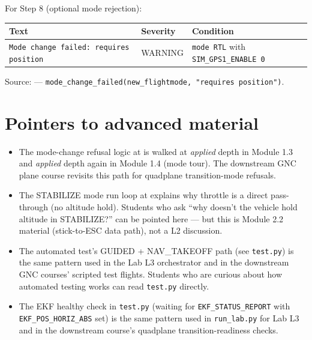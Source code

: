 \documentclass[a4paper,11pt,twoside]{article}
\begin{document}
For Step 8 (optional mode rejection):

\begin{center}\small
\begin{tabular}{|p{5.5cm}|p{2.0cm}|p{7.0cm}|}\hline
\textbf{Text} & \textbf{Severity} & \textbf{Condition} \\ \hline
\texttt{Mode change failed: requires position} & WARNING & \texttt{mode RTL} with \texttt{SIM\_GPS1\_ENABLE 0} \\ \hline
\end{tabular}
\end{center}

Source:  --- \texttt{mode\_change\_failed(new\_flightmode, "requires position")}.

\section*{Pointers to advanced material}

\begin{itemize}
  \item The mode-change refusal logic at  is walked at \emph{applied} depth in Module 1.3 and \emph{applied} depth again in Module 1.4 (mode tour). The downstream GNC plane course revisits this path for quadplane transition-mode refusals.
  \item The STABILIZE mode run loop at  explains why throttle is a direct pass-through (no altitude hold). Students who ask ``why doesn't the vehicle hold altitude in STABILIZE?'' can be pointed here --- but this is Module 2.2 material (stick-to-ESC data path), not a L2 discussion.
  \item The automated test's GUIDED + NAV\_TAKEOFF path (see \texttt{test.py}) is the same pattern used in the Lab L3 orchestrator and in the downstream GNC courses' scripted test flights. Students who are curious about how automated testing works can read \texttt{test.py} directly.
  \item The EKF healthy check in \texttt{test.py} (waiting for \texttt{EKF\_STATUS\_REPORT} with \texttt{EKF\_POS\_HORIZ\_ABS} set) is the same pattern used in \texttt{run\_lab.py} for Lab L3 and in the downstream course's quadplane transition-readiness checks.
\end{itemize}

\else
\end{document}

